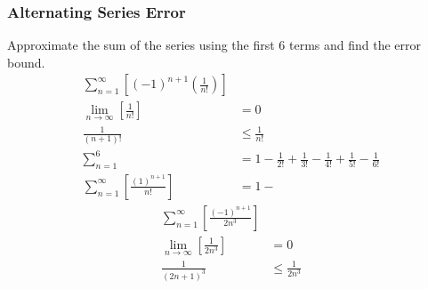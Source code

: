 \documentclass[12pt, A4]{article}
\begin{document}
			\subsubsection*{Alternating Series Error}
				Approximate the sum of the series using the first 6 terms and find the error bound.
				\begin{align*}
					\sum_{n = 1}^\infty\left[(-1)^{n + 1}\left(\frac{1}{n!}\right)\right] \\
					\lim_{n\to\infty}\left[\frac{1}{n!}\right] &= 0 \\
					\frac{1}{(n + 1)!} &\le \frac{1}{n!} \\
					\sum_{n = 1}^6 &= 1 - \frac{1}{2!} + \frac{1}{3!} - \frac{1}{4!} + \frac{1}{5!} - \frac{1}{6!} \\
					\sum_{n = 1}^\infty\left[\frac{(1)^{n + 1}}{n!}\right] &= 1 -
				\end{align*}
				\begin{align*}
					\sum_{n = 1}^\infty\left[\frac{(-1)^{n + 1}}{2n^3}\right] \\
					\lim_{n\to\infty}\left[\frac{1}{2n^3}\right] &= 0 \\
					\frac{1}{(2n + 1)^3} &\le \frac{1}{2n^3} \\
				\end{align*}
\end{document}
